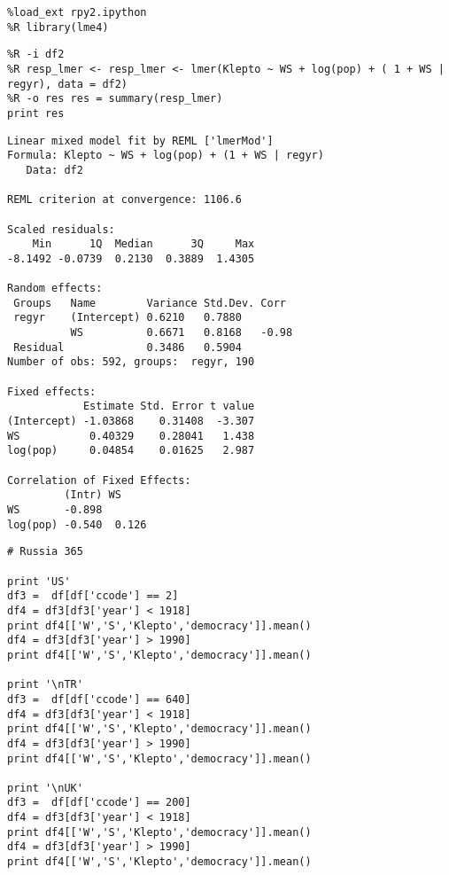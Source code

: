 \documentclass[12pt,fleqn]{article}\usepackage{common}
\begin{document}
\begin{verbatim}
%load_ext rpy2.ipython
%R library(lme4)
\end{verbatim}

\begin{verbatim}
%R -i df2
%R resp_lmer <- resp_lmer <- lmer(Klepto ~ WS + log(pop) + ( 1 + WS | regyr), data = df2)
%R -o res res = summary(resp_lmer)
print res
\end{verbatim}

\begin{verbatim}
Linear mixed model fit by REML ['lmerMod']
Formula: Klepto ~ WS + log(pop) + (1 + WS | regyr)
   Data: df2

REML criterion at convergence: 1106.6

Scaled residuals: 
    Min      1Q  Median      3Q     Max 
-8.1492 -0.0739  0.2130  0.3889  1.4305 

Random effects:
 Groups   Name        Variance Std.Dev. Corr 
 regyr    (Intercept) 0.6210   0.7880        
          WS          0.6671   0.8168   -0.98
 Residual             0.3486   0.5904        
Number of obs: 592, groups:  regyr, 190

Fixed effects:
            Estimate Std. Error t value
(Intercept) -1.03868    0.31408  -3.307
WS           0.40329    0.28041   1.438
log(pop)     0.04854    0.01625   2.987

Correlation of Fixed Effects:
         (Intr) WS    
WS       -0.898       
log(pop) -0.540  0.126

\end{verbatim}

\begin{verbatim}
# Russia 365

print 'US'
df3 =  df[df['ccode'] == 2]
df4 = df3[df3['year'] < 1918]
print df4[['W','S','Klepto','democracy']].mean()
df4 = df3[df3['year'] > 1990]
print df4[['W','S','Klepto','democracy']].mean()

print '\nTR'
df3 =  df[df['ccode'] == 640]
df4 = df3[df3['year'] < 1918]
print df4[['W','S','Klepto','democracy']].mean()
df4 = df3[df3['year'] > 1990]
print df4[['W','S','Klepto','democracy']].mean()

print '\nUK'
df3 =  df[df['ccode'] == 200]
df4 = df3[df3['year'] < 1918]
print df4[['W','S','Klepto','democracy']].mean()
df4 = df3[df3['year'] > 1990]
print df4[['W','S','Klepto','democracy']].mean()
\end{verbatim}
\end{document}
